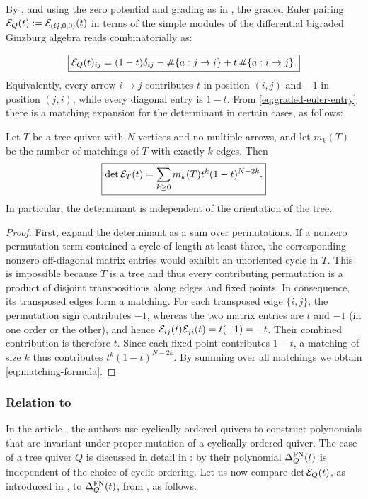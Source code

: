 \noindent By , and using the zero potential and grading as in , the graded Euler pairing $\mathcal E_Q(t):= \mathcal E_{(Q,0,0)}(t)$ in terms of the simple modules of the differential bigraded Ginzburg algebra reads combinatorially as:

\begin{equation}\label{eq:graded-euler-entry}
 \boxed{
 \mathcal E_Q(t)_{ij}
 =(1-t)\delta_{ij}
 -\#\{a:j\to i\}
 +t\,\#\{a:i\to j\}.}
\end{equation}
Equivalently, every arrow $i\to j$ contributes $t$ in position $(i,j)$ and
$-1$ in position $(j,i)$, while every diagonal entry is $1-t$. From \eqref{eq:graded-euler-entry} there is a matching expansion for the determinant in certain cases, as follows:

\begin{lemma}\label{lem:matching}
Let $T$ be a tree quiver with $N$ vertices and no multiple arrows, and let $m_k(T)$ be the number of matchings of $T$ with exactly $k$ edges.  Then
\begin{equation}\label{eq:matching-formula}
 \boxed{
 \det\mathcal E_T(t)=\sum_{k\ge 0}m_k(T)t^k(1-t)^{N-2k}.
 }
\end{equation}
In particular, the determinant is independent of the orientation of the tree.
\end{lemma}

\begin{proof}
First, expand the determinant as a sum over permutations. If a nonzero permutation term contained a cycle of length at least three, the corresponding nonzero off-diagonal matrix entries would exhibit an unoriented cycle in $T$. This is impossible because $T$ is a tree and thus every contributing permutation is a product of disjoint transpositions along edges and fixed points. In consequence, its transposed edges form a matching. For each transposed edge $\{i,j\}$, the permutation sign contributes $-1$, whereas the two matrix entries are $t$ and $-1$ (in one order or the other), and hence $\mathcal E_{ij}(t)\mathcal E_{ji}(t)=t(-1)=-t$.  Their combined contribution is therefore $t$. Since each fixed point contributes $1-t$, a matching of size $k$ thus contributes $t^k(1-t)^{N-2k}$. By summing over all matchings we obtain \eqref{eq:matching-formula}.
\end{proof}

\subsubsection{Relation to \cite{FominNeville}} In the article \cite{FominNeville}, the authors use cyclically ordered quivers to construct polynomials that are invariant under proper mutation of a cyclically ordered quiver. The case of a tree quiver $Q$ is discussed in detail in \cite[Section 10]{FominNeville}: by \cite[Prop.~2.6\&Cor.~4.11]{FominNeville} their polynomial $\Delta^{\mathrm{FN}}_Q(t)$ is independent of the choice of cyclic ordering. Let us now compare $\det\mathcal E_Q(t)$, as introduced in , to $\Delta^{\mathrm{FN}}_Q(t)$, from \cite{FominNeville}, as follows.\\

